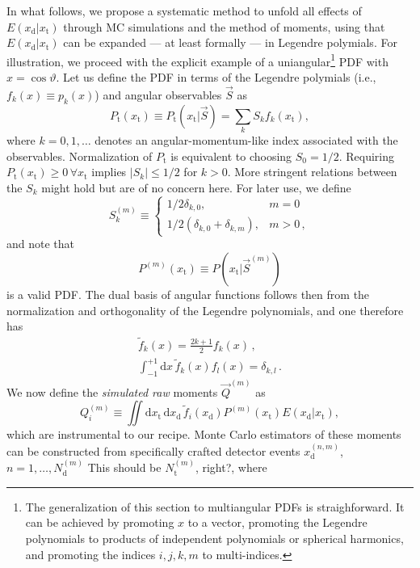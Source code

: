 \documentclass[aps,nofootinbib,preprintnumbers,prd,twocolumn]{revtex4-1}
\newcommand{\rmdx}[1]{\mbox{d} #1 \,} %
\newcommand{\subd}{_{\text{d}}}
\newcommand{\subt}{_{\text{t}}}
\renewcommand{\theta}{\vartheta}
\newcommand{\xd}{x\subd}
\newcommand{\xt}{x\subt}
\newcommand{\Ekernel}{E(\xd|\xt)}
\newcommand{\fred}[1]{{\color{brown!85!black}#1}}
\begin{document}
In what follows, we propose a systematic method to unfold all effects
of $\Ekernel$ through MC simulations and the method of moments,
using that $\Ekernel$ can be expanded --- at
least formally --- in Legendre polymials.  For illustration, we
proceed with the explicit example of a uniangular\footnote{%
  The generalization of this section to multiangular PDFs is
  straighforward. It can be achieved by promoting $x$ to a vector,
  promoting the Legendre polynomials to products of independent
  polynomials or spherical harmonics, and promoting the indices
  $i,j,k,m$ to multi-indices.  } PDF with $x = \cos\theta$. Let us
define the PDF in terms of the Legendre polymials (i.e., $f_k(x)
\equiv p_k(x)$) and angular observables $\vec{S}$ as
\begin{equation}
    P\subt(\xt) \equiv P\subt(\xt | \vec{S}) = \sum_k S_k f_k(\xt),
  \end{equation}
where $k = 0, 1, \dots$ denotes an angular-momentum-like index associated with the observables.
Normalization of $P\subt$ is equivalent to choosing $S_0 = 1/2$. Requiring $P\subt(\xt) \ge 0 \,\forall \xt$
implies $|S_k| \leq 1/2$ for $k > 0$. More stringent relations between the
$S_k$ might hold but are of no concern here. For later use, we define
\begin{equation}
  \label{eq:def-Sk}
  S^{(m)}_k \equiv
  \begin{cases}
    1/2 \delta_{k,0}, & m=0\\
    1/2 (\delta_{k,0} + \delta_{k,m}), & m>0 \,,
  \end{cases}
\end{equation}
and note that
\begin{equation}
    P^{(m)}(\xt) \equiv P(\xt | \vec{S}^{(m)})
\end{equation}
is a valid PDF. The dual basis of angular functions follows then from the normalization
and orthogonality of the Legendre polynomials, and one therefore has
\begin{gather}
    \tilde{f}_k(x) = \frac{2 k + 1}{2} f_k(x)\,,\\
    \int_{-1}^{+1} \rmdx{x} \tilde{f}_k(x) f_l(x) = \delta_{k,l}\,.
\end{gather}
We now define the \emph{simulated raw} moments $\vec{Q}^{(m)}$ as
\begin{equation}
    \label{eq:analytic-raw-moments}
    Q_i^{(m)} \equiv \iint \rmdx{\xt} \rmdx{\xd} \tilde{f}_i(\xd) P^{(m)}(\xt) \Ekernel,
\end{equation}
which are instrumental to our recipe. Monte Carlo estimators of these moments can be constructed from specifically crafted detector events $x_\text{d}^{(n,m)}$, $n = 1, \dots, N_\text{d}^{(m)}$ \fred{This should be $N_\text{t}^{(m)}$, right?}, where
\end{document}

